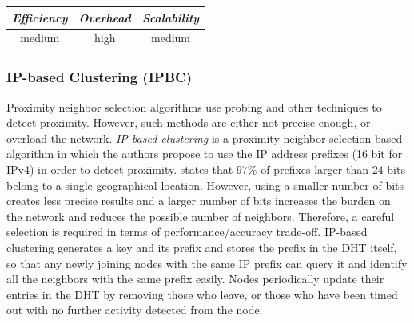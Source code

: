 %
%
%

\begin{center}
\begin{tabular}{ccc}
\emph{Efficiency} & \emph{Overhead} & \emph{Scalability} \\
\hline
medium &
high &
medium
\end{tabular}
\end{center}

\subsubsection{IP-based Clustering (IPBC)}
Proximity neighbor selection algorithms use probing and other techniques to
detect proximity. However, such methods are either not precise enough, or
overload the network. \emph{IP-based clustering} \cite{KM2007} is a proximity
neighbor selection based algorithm in which the authors propose to use the IP
address prefixes (16 bit for IPv4) in order to detect proximity.
\cite{freedman_iploc_2005} states that $97\%$ of prefixes larger than $24$ bits
belong to a single geographical location. However, using a smaller number of bits
creates less precise results and a larger number of bits increases the burden on the
network and reduces the possible number of neighbors. Therefore, a careful
selection is required in terms of performance/accuracy trade-off. IP-based
clustering generates a key and its prefix and stores the prefix in the DHT
itself, so that any newly joining nodes with the same IP prefix can query it and
identify all the neighbors with the same prefix easily.  Nodes
periodically update their entries in the DHT by removing those who leave, or
those who have been timed out with no further activity detected from the node.

